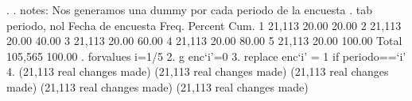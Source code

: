 . 
. notes: Nos generamos una dummy por cada periodo de la encuesta
{\smallskip}
. tab periodo, nol
{\smallskip}
   Fecha de {\VBAR}
   encuesta {\VBAR}      Freq.     Percent        Cum.
          1 {\VBAR}     21,113       20.00       20.00
          2 {\VBAR}     21,113       20.00       40.00
          3 {\VBAR}     21,113       20.00       60.00
          4 {\VBAR}     21,113       20.00       80.00
          5 {\VBAR}     21,113       20.00      100.00
      Total {\VBAR}    105,565      100.00
{\smallskip}
. forvalues i=1/5 {\lbr}
  2.     g enc`i'=0
  3.         replace enc`i' = 1 if periodo==`i'
  4. {\rbr}
(21,113 real changes made)
(21,113 real changes made)
(21,113 real changes made)
(21,113 real changes made)
(21,113 real changes made)
{\smallskip}

